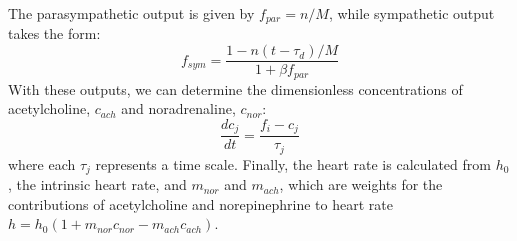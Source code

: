 \documentclass[12pt]{article}
\begin{document}
The parasympathetic output is given by $f_{par} = n/M$, while sympathetic output takes the form:
\begin{equation}
f_{sym} = \frac{1-n(t-\tau_d)/M}{1+\beta f_{par}}
\end{equation}
With these outputs, we can determine the dimensionless concentrations of acetylcholine, $c_{ach}$ and noradrenaline, $c_{nor}$:
\begin{equation}
\label{dcnordt}
\frac{dc_{j}}{dt} = \frac{f_{i}-c_{j}}{\tau_{j}}
\end{equation}
where each $\tau_{j}$ represents a time scale.
Finally, the heart rate is calculated from $h_0$, the intrinsic heart rate, and $m_{nor}$ and $m_{ach}$,
which are weights for the contributions of acetylcholine and norepinephrine to heart rate $h = h_0(1+m_{nor}c_{nor} - m_{ach}c_{ach})$.
\end{document}
